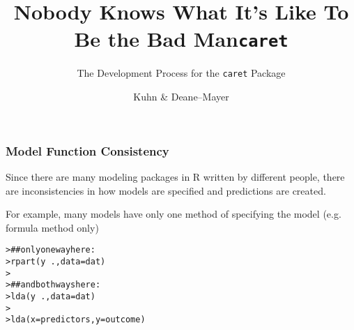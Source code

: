 \documentclass[12 pt]{beamer}\usepackage[]{graphicx}\usepackage[]{color}
\title{\large Nobody Knows What It's Like To Be the Bad Man}
\subtitle{The Development Process for the {\tt{caret}} Package}
\author[Subham Kuhn \& Deane--Mayer]
{%
   \texorpdfstring{
        \begin{columns}
            \column{.45\linewidth}
            \centering
            Max Kuhn\\
            Pfizer Global R$\&$D\\
            \href{mailto:max.kuhn@pfizer.com}{max.kuhn@pfizer.com}
            \column{.45\linewidth}
            \centering
            Zachary Deane--Mayer\\
            Cognius\\
            \href{mailto:zach.mayer@gmail.com}{zach.mayer@gmail.com}
        \end{columns}
   }
   {John Doe \& Jane Doe}
}
\date{}
\makeatletter
\newcommand{\hlcom}[1]{\textcolor[rgb]{0.588,0.588,0.588}{#1}}%
\newcommand{\hlopt}[1]{\textcolor[rgb]{0.196,0.196,0.196}{#1}}%
\newcommand{\hlstd}[1]{\textcolor[rgb]{0.196,0.196,0.196}{#1}}%
\newcommand{\hlkwc}[1]{\textcolor[rgb]{0,0.631,0.314}{#1}}%
\newcommand{\hlkwd}[1]{\textcolor[rgb]{0.78,0.227,0.412}{#1}}%
\newenvironment{kframe}{%
 \def\at@end@of@kframe{}%
 \ifinner\ifhmode%
  \def\at@end@of@kframe{\end{minipage}}%
  \begin{minipage}{\columnwidth}%
 \fi\fi%
 \def\FrameCommand##1{\hskip\@totalleftmargin \hskip-\fboxsep
 \colorbox{shadecolor}{##1}\hskip-\fboxsep
     \hskip-\linewidth \hskip-\@totalleftmargin \hskip\columnwidth}%
 \MakeFramed {\advance\hsize-\width
   \@totalleftmargin\z@ \linewidth\hsize
   \@setminipage}}%
 {\par\unskip\endMakeFramed%
 \at@end@of@kframe}
\newenvironment{knitrout}{}{} %
\makeatother
\begin{document}
\begin{frame}[plain]
  \maketitle
\end{frame}

\title{\tt{caret}}
\author{Kuhn \& Deane--Mayer}


  \begin{frame}[fragile]
\frametitle{Model Function Consistency}

Since there are many modeling packages in R written by different people,
there are inconsistencies in how models are specified and
predictions are created.

\vspace{.15in}

For example, many models have only one method of specifying the model
(e.g. formula method only)

\vspace{.1in}

\begin{knitrout}\scriptsize
{}\color{fgcolor}\begin{kframe}
\begin{alltt}
\hlstd{> }\hlcom{## only one way here:}
\hlstd{> }\hlkwd{rpart}\hlstd{(y} \hlopt{~} \hlstd{.,} \hlkwc{data} \hlstd{= dat)}
\hlstd{> }
\hlstd{> }\hlcom{## and both ways here:}
\hlstd{> }\hlkwd{lda}\hlstd{(y} \hlopt{~} \hlstd{.,} \hlkwc{data} \hlstd{= dat)}
\hlstd{> }
\hlstd{> }\hlkwd{lda}\hlstd{(}\hlkwc{x} \hlstd{= predictors,} \hlkwc{y} \hlstd{= outcome)}
\end{alltt}
\end{kframe}
\end{knitrout}

\end{frame}

\end{document}
